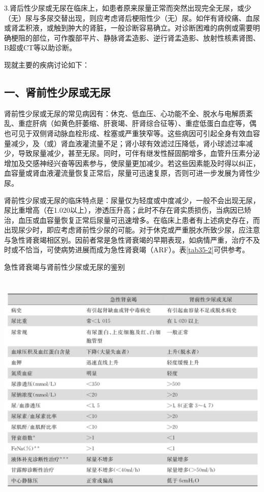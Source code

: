 3.肾后性少尿或无尿在临床上，如患者原来尿量正常而突然出现完全无尿，或少（无）尿与多尿交替出现，则应考虑肾后梗阻性少（无）尿。如伴有肾绞痛、血尿或肾盂积液，或触到肿大的肾脏，一般诊断容易确立。对诊断困难的病例或需要明确梗阻的部位，可作腹部平片、静脉肾盂造影、逆行肾盂造影、放射性核素肾图、B超或CT等以助诊断。

现就主要的疾病讨论如下：

\protect\hypertarget{text00270.html}{}{}

\subsection{一、肾前性少尿或无尿}

肾前性少尿或无尿的常见病因有：休克、低血压、心功能不全、脱水与电解质紊乱、重症肝病（如黄色肝萎缩、肝衰竭、肝肾综合征等）、重症低蛋白血症等，偶也可见于双侧肾动脉血栓形成、栓塞或严重狭窄等。这些病因可引起全身有效血容量减少，及（或）肾血液灌流量不足；肾小球有效滤过压降低，肾小球滤过率减少，导致尿量减少，甚至无尿。同时，可伴有继发性醛固酮增多，血管升压素分泌增加及交感神经兴奋等因素参与，使尿量更加减少。若这些因素能及时得以纠正，血容量或肾血液灌流量恢复正常后，尿量可迅速复原，否则可进一步发展为肾性少尿。

肾前性少尿或无尿的临床特点是：尿量仅为轻度或中度减少，一般不会出现无尿，尿比重增高（在1.020以上），渗透压升高；此时不存在肾实质损伤，当病因已矫治，血压或血容量恢复正常后尿量可迅速增多。在临床上患者有上述病史存在，而出现尿少时，即应考虑肾前性少尿的可能。对于休克或严重脱水所致少尿，应注意与急性肾衰竭相区别。因前者常是急性肾衰竭的早期表现，如病情严重，治疗不及时或不恰当，可使病势进展而成为急性肾衰竭（ARF）。表\ref{tab35-2}可供参考。

\begin{table}[htbp]
\centering
\caption{急性肾衰竭与肾前性少尿或无尿的鉴别}
\label{tab35-2}
\includegraphics[width=5.95833in,height=4.55208in]{./images/Image00211.jpg}
\end{table}

